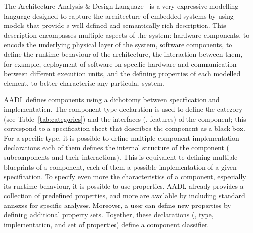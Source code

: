 The Architecture Analysis \& Design Language~\cite{feiler2006architecture} is a very expressive modelling language designed to capture the architecture of embedded systems by using models that provide a well-defined and semantically rich description. This description encompasses multiple aspects of the system: hardware components, to encode the underlying physical layer of the system, software components, to define the runtime behaviour of the architecture, the interaction between them, for example, deployment of software on specific hardware and communication between different execution units, and the defining properties of each modelled element, to better characterise any particular system.

AADL defines components using a dichotomy between specification and implementation. The component type declaration is used to define the category (see Table~\ref{tab:categories}) and the interfaces (\ie, features) of the component; this correspond to a specification sheet that describes the component as a black box. For a specific type, it is possible to define multiple component implementation declarations each of them defines the internal structure of the component (\ie, subcomponents and their interactions). This is equivalent to defining multiple blueprints of a component, each of them a possible implementation of a given specification. To specify even more the characteristics of a component, especially its runtime behaviour, it is possible to use properties. AADL already provides a collection of predefined properties, and more are available by including standard annexes for specific analyses. Moreover, a user can define new properties by defining additional property sets. Together, these declarations (\ie, type, implementation, and set of properties) define a component classifier.
 
